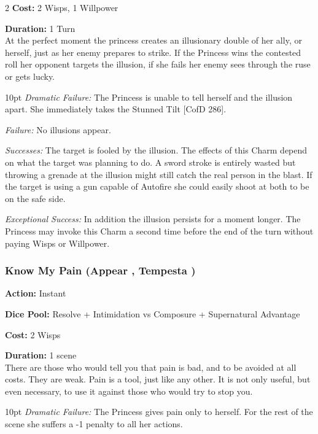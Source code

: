 \begin{multicols}{2}
\noindent \textbf{Cost:} 2 Wisps, 1 Willpower

\noindent \textbf{Duration:} 1 Turn\\

\noindent At the perfect moment the princess creates an illusionary double of her ally, or herself, just as her enemy prepares to strike. If the Princess wins the contested roll her opponent targets the illusion, if she fails her enemy sees through the ruse or gets lucky.

\begin{myindentpar}{10pt}     \emph{Dramatic Failure:} The Princess is unable to tell herself and the illusion apart. She immediately takes the Stunned Tilt [CofD 286].

    \emph{Failure:} No illusions appear.

    \emph{Successes:}  The target is fooled by the illusion. The effects of this Charm depend on what the target was planning to do. A sword stroke is entirely wasted but throwing a grenade at the illusion might still catch the real person in the blast. If the target is using a gun capable of Autofire she could easily shoot at both to be on the safe side.

    \emph{Exceptional Success:} In addition the illusion persists for a moment longer. The Princess may invoke this Charm a second time before the end of the turn without paying Wisps or Willpower. \end{myindentpar}




\subsubsection*{Know My Pain (Appear \textbullet\textbullet\textbullet, Tempesta \textbullet\textbullet)}
\noindent \textbf{Action:} Instant

\noindent \textbf{Dice Pool:} Resolve + Intimidation vs Composure + Supernatural Advantage

\noindent \textbf{Cost:} 2 Wisps

\noindent \textbf{Duration:} 1 scene\\ 

\noindent There are those who would tell you that pain is bad, and to be avoided at all costs. They are weak. Pain is a tool, just like any other. It is not only useful, but even necessary, to use it against those who would try to stop you.

\begin{myindentpar}{10pt}    \emph{Dramatic Failure:} The Princess gives pain only to herself. For the rest of the scene she suffers a -1 penalty to all her actions.


\end{myindentpar}
\end{multicols}
